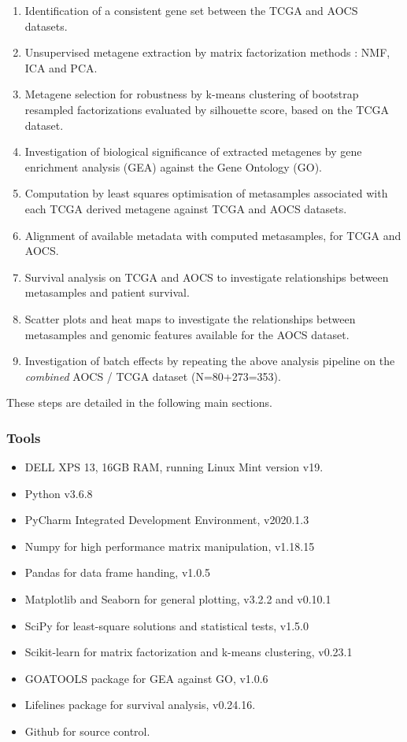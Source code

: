 \documentclass[tikz, 12pt,a4paper,oneside,fleqn]{article}
\begin{document}
\begin{enumerate}
\item
Identification of a consistent gene set between the TCGA and AOCS datasets.
\item
Unsupervised metagene extraction by matrix factorization methods : NMF, ICA and PCA.
\item
Metagene selection for robustness by k-means clustering of bootstrap resampled factorizations evaluated by silhouette score, based on the TCGA dataset.
\item
Investigation of biological significance of extracted metagenes by gene enrichment analysis (GEA) against the Gene Ontology (GO).
\item
Computation by least squares optimisation of metasamples associated with each TCGA derived metagene against TCGA and AOCS datasets.
\item
Alignment of available metadata with computed metasamples, for TCGA and AOCS.
\item 
Survival analysis on TCGA and AOCS to investigate relationships between metasamples and patient survival.
\item
Scatter plots and heat maps to investigate the relationships between metasamples and genomic features available for the AOCS dataset.
\item
Investigation of batch effects by repeating the above analysis pipeline on the \emph{combined} AOCS / TCGA dataset (N=80+273=353).

\end{enumerate}

These steps are detailed in the following main sections.

\FloatBarrier

\subsubsection{Tools}
\begin{itemize}
\itemsep -0.5em 
\item DELL XPS 13, 16GB RAM, running Linux Mint version v19.
\item Python v3.6.8
\item PyCharm Integrated Development Environment, v2020.1.3
\item Numpy for high performance matrix manipulation, v1.18.15
\item Pandas for data frame handing, v1.0.5
\item Matplotlib and Seaborn for general plotting, v3.2.2 and v0.10.1
\item SciPy for least-square solutions and statistical tests, v1.5.0
\item Scikit-learn for matrix factorization and k-means clustering, v0.23.1
\item GOATOOLS package for GEA against GO, v1.0.6
\item Lifelines package for survival analysis, v0.24.16.
\item Github for source control.
\end{itemize}
\end{document}

